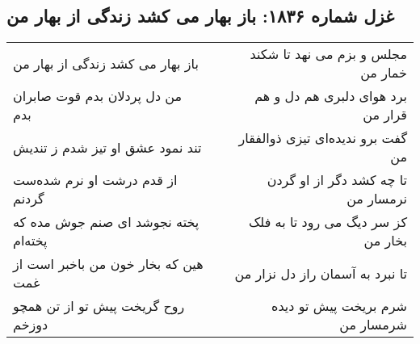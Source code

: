 \begin{center}
\section*{غزل شماره ۱۸۳۶: باز بهار می کشد زندگی از بهار من}
\label{sec:1836}
\begin{longtable}{l p{0.5cm} r}
باز بهار می کشد زندگی از بهار من
&&
مجلس و بزم می نهد تا شکند خمار من
\\
من دل پردلان بدم قوت صابران بدم
&&
برد هوای دلبری هم دل و هم قرار من
\\
تند نمود عشق او تیز شدم ز تندیش
&&
گفت برو ندیده‌ای تیزی ذوالفقار من
\\
از قدم درشت او نرم شده‌ست گردنم
&&
تا چه کشد دگر از او گردن نرمسار من
\\
پخته نجوشد ای صنم جوش مده که پخته‌ام
&&
کز سر دیگ می رود تا به فلک بخار من
\\
هین که بخار خون من باخبر است از غمت
&&
تا نبرد به آسمان راز دل نزار من
\\
روح گریخت پیش تو از تن همچو دوزخم
&&
شرم بریخت پیش تو دیده شرمسار من
\\
\end{longtable}
\end{center}
